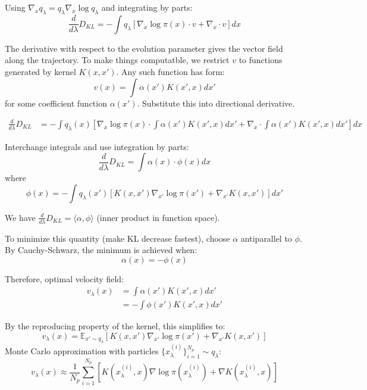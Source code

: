 \documentclass{article}
\begin{document}
Using $\nabla_x q_\lambda = q_\lambda \nabla_x \log q_\lambda$ and integrating by parts:
\begin{equation}
\frac{d}{d\lambda} D_{KL} = -\int q_\lambda \left[\nabla_x \log \pi(x) \cdot v + \nabla_x \cdot v\right] dx 
\end{equation}

The derivative with respect to the evolution parameter gives the vector field along the trajectory. To make things computatble, we restrict $v$ to functions generated by kernel $K(x,x')$. Any such function has form:
\begin{equation}
v(x) = \int \alpha(x') K(x', x) dx'
\end{equation}
for some coefficient function $\alpha(x')$. Substitute this into directional derivative.

\begin{align}
\frac{d}{d\lambda}D_{KL} &= -\int q_\lambda(x) \left[\nabla_x \log \pi(x) \cdot \int \alpha(x') K(x', x) dx' + \nabla_x \cdot \int \alpha(x') K(x', x) dx'\right] dx
\end{align}

Interchange integrals and use integration by parts:
\begin{equation}
\frac{d}{d\lambda} D_{KL} = \int \alpha(x) \cdot \phi(x) dx
\end{equation}
where
\begin{equation}
\phi(x) = -\int q_\lambda(x') \left[K(x,x')\nabla_{x'} \log \pi(x') + \nabla_{x'} K(x,x')\right] dx'
\end{equation}

We have $\frac{d}{d\lambda} D_{KL} = \langle \alpha, \phi \rangle$ (inner product in function space).

To minimize this quantity (make KL decrease fastest), choose $\alpha$ antiparallel to $\phi$. By Cauchy-Schwarz, the minimum is achieved when:
\begin{equation}
\alpha(x) = -\phi(x)
\end{equation}

Therefore, optimal velocity field:
\begin{align}
v_\lambda(x) &= \int \alpha(x') K(x', x) dx' \\
&= -\int \phi(x') K(x', x) dx'
\end{align}

By the reproducing property of the kernel, this simplifies to:
\begin{equation}
\boxed{v_\lambda(x) = \mathbb{E}_{x' \sim q_\lambda}\left[K(x,x')\nabla_{x'} \log \pi(x') + \nabla_{x'} K(x,x')\right]}
\end{equation}
Monte Carlo approximation with particles $\{x_\lambda^{(i)}\}_{i=1}^{N_p} \sim q_\lambda$:
\begin{equation}
v_\lambda(x) \approx \frac{1}{N_p} \sum_{i=1}^{N_p} \left[K(x^{(i)}_\lambda, x)\nabla \log \pi(x^{(i)}_\lambda) + \nabla K(x^{(i)}_\lambda, x)\right]
\end{equation}
\end{document}
